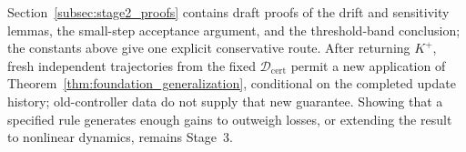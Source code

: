 Section~\ref{subsec:stage2_proofs} contains draft proofs of the drift and
sensitivity lemmas, the small-step acceptance argument, and the threshold-band
conclusion; the constants above give one explicit conservative route.
After returning $K^+$, fresh independent trajectories from the fixed
$\mathcal D_{\mathrm{cert}}$ permit a new application of
Theorem~\ref{thm:foundation_generalization}, conditional on the completed
update history; old-controller data do not supply that new guarantee.
Showing that a specified rule generates enough gains to outweigh losses,
or extending the result to nonlinear dynamics, remains Stage~3.

